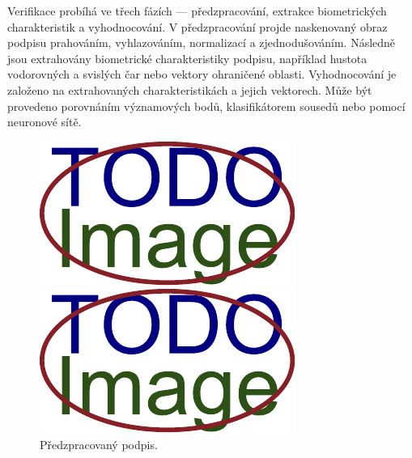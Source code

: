 Verifikace probíhá ve třech fázích --- předzpracování, extrakce biometrických charakteristik a vyhodnocování. %
V předzpracování projde naskenovaný obraz podpisu prahováním, vyhlazováním, normalizací a zjednodušováním.    %
Následně jsou extrahovány biometrické charakteristiky podpisu,                                                %
například hustota vodorovných a svislých čar nebo vektory ohraničené oblasti.                                 %
Vyhodnocování je založeno na extrahovaných charakteristikách a jejich vektorech.                              %
Může být provedeno porovnáním významových bodů, klasifikátorem sousedů nebo  pomocí neuronové sítě.\cite{RakRoman2008}%

\begin{figure}[h]
  \centering
  \begin{minipage}{0.3\textwidth}
    \centering
    \includegraphics[width=\textwidth]{obrazky-figures/placeholder.pdf}
    \caption{Předzpracovaný podpis.}
    \label{fig:first-image}
  \end{minipage}\hfill
  \begin{minipage}{0.3\textwidth}
    \centering
    \includegraphics[width=\textwidth]{obrazky-figures/placeholder.pdf}

\end{minipage}
\end{figure}

